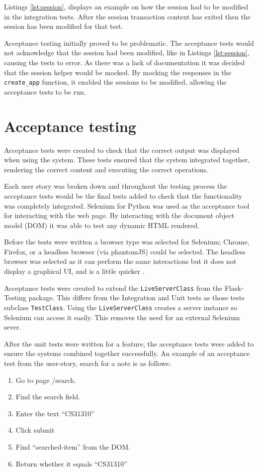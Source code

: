 Listings \ref{lst:session}, displays an example on how the session had to be modified in the integration tests. After the session transaction context has exited then the session has been modified for that test.

Acceptance testing initially proved to be problematic. The acceptance tests would not acknowledge that the session had been modified, like in Listings \ref{lst:session}, causing the tests to error. As there was a lack of documentation it was decided that the session helper would be mocked. By mocking the responses in the \texttt{create\_app} function, it enabled the sessions to be modified, allowing the acceptance tests to be run.
\section{Acceptance testing}
Acceptance tests were created to check that the correct output was displayed when using the system. These tests ensured that the system integrated together, rendering the correct content and executing the correct operations.

Each user story was broken down and throughout the testing process the acceptance tests would be the final tests added to check that the functionality was completely integrated. Selenium for Python \cite{citeulike:14020625} was used as the acceptance tool for interacting with the web page. By interacting with the document object model (DOM) it was able to test any dynamic HTML rendered.

Before the tests were written a browser type was selected for Selenium; Chrome, Firefox, or a headless browser (via phantomJS) could be selected. The headless browser was selected as it can perform the same interactions but it does not display a graphical UI, and is a little quicker \cite{citeulike:13983611}.

Acceptance tests were created to extend the \texttt{LiveServerClass} from the Flask-Testing package. This differs from the Integration and Unit tests as those tests subclass \texttt{TestClass}. Using the \texttt{LiveServerClass} creates a server instance so Selenium can access it easily. This removes the need for an external Selenium sever.

After the unit tests were written for a feature, the acceptance tests were added to ensure the systems combined together successfully. An example of an acceptance test from the user-story, search for a note is as follows:
\begin{enumerate}
  \item Go to page /search.
  \item Find the search field.
  \item Enter the text ``CS31310''
  \item Click submit
  \item Find ``searched-item'' from the DOM.
  \item Return whether it equals ``CS31310''
\end{enumerate}

